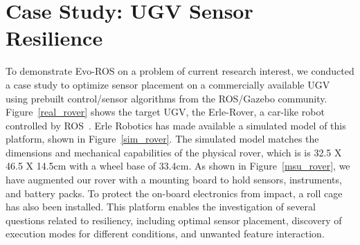 \section{Case Study: UGV Sensor Resilience}
\label{s:rover}




%
To demonstrate Evo-ROS on a problem of current research interest, we conducted a case study to optimize sensor placement 
on a commercially available UGV using prebuilt control/sensor algorithms from the ROS/Gazebo community.
Figure~\ref{real_rover} shows the target UGV, the Erle-Rover, a car-like robot controlled by ROS~\cite{erle.rover.main}.  
%
Erle Robotics has made available a simulated model of this platform, shown in Figure~\ref{sim_rover}.  
%
The simulated model matches the dimensions and mechanical capabilities of the physical rover, which is
%
%
is 32.5 X 46.5 X 14.5cm with a wheel base of 33.4cm. 
%
As shown in Figure~\ref{msu_rover}, we have augmented our rover with a mounting board to hold
sensors, instruments, and battery packs. To protect the on-board electronics from impact, a roll cage has also been installed. 
This platform enables the investigation of several 
questions related to resiliency, including optimal sensor placement, discovery of 
execution modes for different conditions, and unwanted feature interaction.
%

